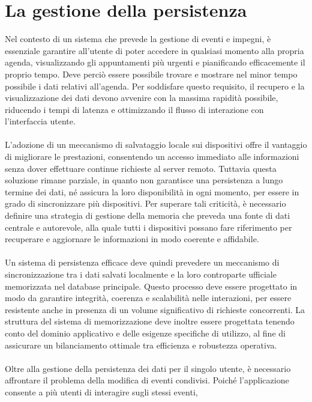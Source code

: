 \chapter{La gestione della persistenza}

Nel contesto di un sistema che prevede la gestione di eventi e impegni, 
è essenziale garantire all’utente di poter accedere in qualsiasi momento alla propria agenda, 
visualizzando gli appuntamenti più urgenti e pianificando efficacemente il proprio tempo. 
Deve perciò essere possibile trovare e mostrare nel minor tempo possibile i dati relativi all’agenda. 
Per soddisfare questo requisito, 
il recupero e la visualizzazione dei dati devono avvenire con la massima rapidità possibile, 
riducendo i tempi di latenza e ottimizzando il flusso di interazione con l’interfaccia utente.\\
\\
L'adozione di un meccanismo di salvataggio locale sui dispositivi 
offre il vantaggio di migliorare le prestazioni, 
consentendo un accesso immediato alle informazioni senza dover effettuare continue richieste al server remoto. 
Tuttavia questa soluzione rimane parziale, 
in quanto non garantisce una persistenza a lungo termine dei dati,
né assicura la loro disponibilità in ogni momento, 
per essere in grado di sincronizzare più dispositivi. 
Per superare tali criticità, 
è necessario definire una strategia di gestione della memoria 
che preveda una fonte di dati centrale e autorevole, 
alla quale tutti i dispositivi possano fare riferimento per recuperare e 
aggiornare le informazioni in modo coerente e affidabile.\\
\\
Un sistema di persistenza efficace deve quindi prevedere 
un meccanismo di sincronizzazione tra i dati salvati localmente e 
la loro controparte ufficiale memorizzata nel database principale. 
Questo processo deve essere progettato in modo da garantire 
integrità, coerenza e scalabilità nelle interazioni, 
per essere resistente anche in presenza di un volume significativo di richieste concorrenti. 
La struttura del sistema di memorizzazione deve inoltre essere progettata 
tenendo conto del dominio applicativo e delle esigenze specifiche di utilizzo, 
al fine di assicurare un bilanciamento ottimale tra efficienza e robustezza operativa.\\
\\
Oltre alla gestione della persistenza dei dati per il singolo utente, 
è necessario affrontare il problema della modifica di eventi condivisi. 
Poiché l'applicazione consente a più utenti di interagire sugli stessi eventi, 
